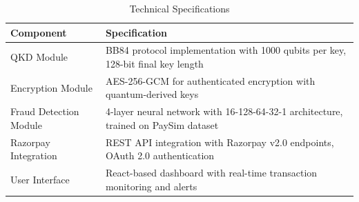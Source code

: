 \begin{table}[!htb]
\centering
\small
\begin{tabular}{|p{4.5cm}|p{9.5cm}|}
\hline
\cellcolor{lightblue!30}\textbf{Component} & \cellcolor{lightblue!30}\textbf{Specification} \\
\hline
QKD Module & BB84 protocol implementation with 1000 qubits per key, 128-bit final key length \\
\hline
Encryption Module & AES-256-GCM for authenticated encryption with quantum-derived keys \\
\hline
Fraud Detection Module & 4-layer neural network with 16-128-64-32-1 architecture, trained on PaySim dataset \\
\hline
Razorpay Integration & REST API integration with Razorpay v2.0 endpoints, OAuth 2.0 authentication \\
\hline
User Interface & React-based dashboard with real-time transaction monitoring and alerts \\
\hline
\end{tabular}
\caption{Technical Specifications}
\label{tab:tech_spec}
\end{table}